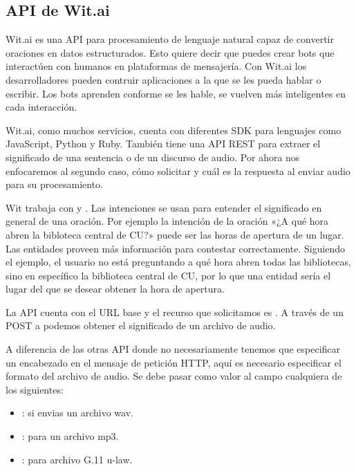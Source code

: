 \subsection{API de Wit.ai}
\label{\detokenize{chapter_one/apis_rest:api-de-wit-ai}}
Wit.ai es una API para procesamiento de lenguaje natural capaz de convertir
oraciones en datos estructurados. Esto quiere decir que puedes crear bots
que interactúen con humanos en plataformas de mensajería. Con Wit.ai los
desarrolladores pueden contruir aplicaciones a la que se les pueda hablar o
escribir. Los bots aprenden conforme se les hable, se vuelven más inteligentes
en cada interacción.

Wit.ai, como muchos servicios, cuenta con diferentes SDK para lenguajes como
JavaScript, Python y Ruby. También tiene una API REST para extraer el significado
de una sentencia o de un discurso de audio. Por ahora nos enfocaremos
al segundo caso, cómo solicitar y cuál es la respuesta al enviar audio
para su procesamiento.

Wit trabaja con  y . Las intenciones se usan para entender
el significado en general de una oración. Por ejemplo la intención
de la oración «¿A qué hora abren la bibloteca central de CU?»
puede ser las horas de apertura de un lugar. Las entidades
proveen más información para contestar correctamente. Siguiendo el ejemplo,
el usuario no está preguntando a qué hora abren todas las bibliotecas,
sino en específico la biblioteca central de CU, por lo que
una entidad sería el lugar del que se desear obtener la hora de apertura.

La API cuenta con el URL base  y el recurso que
solicitamos es . A través de un POST a 
podemos obtener el significado de un archivo de audio.

A diferencia de las otras API donde no necesariamente tenemos que especificar
un encabezado en el mensaje de petición HTTP, aquí es necesario especificar
el formato del archivo de audio. Se debe pasar como valor al campo
 cualquiera de los siguientes:
\begin{itemize}
\item {} 
: si envias un archivo wav.

\item {} 
: para un archivo mp3.

\item {} 
: para archivo G.11 u-law.

\end{itemize}

